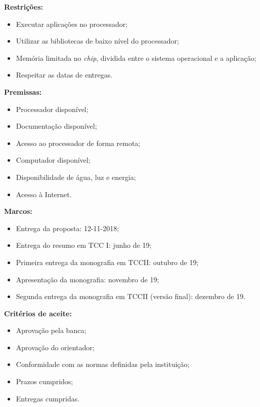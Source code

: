 \documentclass[
  12pt,       %
  openright,      %
  twoside,      %
  a4paper,      %
  english,      %
  brazil,       %
  ]{abntex2}
\begin{document}
    \begin{flushleft}
    \textbf{Restrições:}
    \begin{itemize}
        \item Executar aplicações no processador;
        \item Utilizar as bibliotecas de baixo nível do processador;
        \item Memória limitada no \textit{chip}, dividida entre o sistema operacional e a aplicação;
        \item Respeitar as datas de entregas.
    \end{itemize}
    
    \textbf{Premissas:}
    \begin{itemize}
        \item Processador disponível;
        \item Documentação disponível;
        \item Acesso ao processador de forma remota; 
        \item Computador disponível; 
        \item Disponibilidade de água, luz e energia;
        \item Acesso à Internet.
    \end{itemize}
    
    \textbf{Marcos:}
    \begin{itemize}
        \item Entrega da proposta: 12-11-2018;
        \item Entrega do resumo em TCC I: junho de 19; 
        \item Primeira entrega da monografia em TCCII: outubro de 19; 
        \item Apresentação da monografia: novembro de 19;
        \item Segunda entrega da monografia em TCCII (versão final): dezembro de 19.
    \end{itemize}
    
    \textbf{Critérios de aceite:}
    \begin{itemize}
        \item Aprovação pela banca;
        \item Aprovação do orientador;
        \item Conformidade com as normas definidas pela instituição;
        \item Prazos cumpridos;
        \item Entregas cumpridas.
    \end{itemize}
    \end{flushleft}
\end{document}
